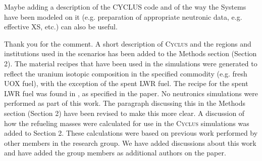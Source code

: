 \documentclass[answers,11pt]{exam}
\newcommand{\Cyclus}{\textsc{Cyclus}\xspace}%
\begin{document}
\begin{questions}
        \question Maybe adding a description of the CYCLUS code and of the way 
        the Systems have been modeled on it (e.g. preparation of appropriate 
        neutronic data, e.g. effective XS, etc.) can also be useful.
        \begin{solution}
                Thank you for the comment. A short description of \Cyclus and the 
                regions and institutions used in the scenarios has 
                been added to the Methods section (Section 2). 
                The material recipes that have been used 
                in the simulations were generated to reflect the uranium isotopic 
                composition in the specified commodity (e.g. fresh UOX fuel), with 
                the exception of the spent \gls{LWR} fuel. The recipe for the spent 
                \gls{LWR} fuel 
                was found in \cite{yacout_visionverifiable_2006}, as specified in 
                the paper. No neutronics simulations were performed as part of this 
                work. The paragraph discussing this in the Methods section (Section 2)
                have been 
                revised to make this more clear. A discussion of how the refueling 
                masses were calculated for use in the \Cyclus simulations was added 
                to Section 2.
                These calculations were based on previous work performed by other 
                members in the research group. We have added discussions about this 
                work and have added the group members as additional authors on the 
                paper. 
        \end{solution}

\end{questions}


\end{document}
